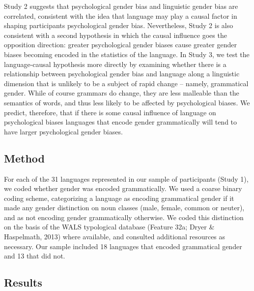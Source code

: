 \documentclass[10pt, letterpaper]{article}
\begin{document}
Study 2 suggests that psychological gender bias and linguistic gender
bias are correlated, consistent with the idea that language may play a
causal factor in shaping participants psychological gender bias.
Nevertheless, Study 2 is also consistent with a second hypothesis in
which the causal influence goes the opposition direction: greater
psychological gender biases cause greater gender biases becoming encoded
in the statistics of the language. In Study 3, we test the
language-causal hypothesis more directly by examining whether there is a
relationship between psychological gender bias and language along a
linguistic dimension that is unlikely to be a subject of rapid change --
namely, grammatical gender. While of course grammars do change, they are
less malleable than the semantics of words, and thus less likely to be
affected by psychological biases. We predict, therefore, that if there
is some causal influence of language on psychological biases languages
that encode gender grammatically will tend to have larger psychological
gender biases.

\subsection{Method}\label{method-3}

For each of the 31 languages represented in our sample of participants
(Study 1), we coded whether gender was encoded grammatically. We used a
coarse binary coding scheme, categorizing a language as encoding
grammatical gender if it made any gender distinction on noun classes
(male, female, common or neuter), and as not encoding gender
grammatically otherwise. We coded this distinction on the basis of the
WALS typological database (Feature 32a; Dryer \& Haspelmath, 2013) where
available, and consulted additional resources as necessary. Our sample
included 18 languages that encoded grammatical gender and 13 that did
not.

\subsection{Results}\label{results-3}
\end{document}
